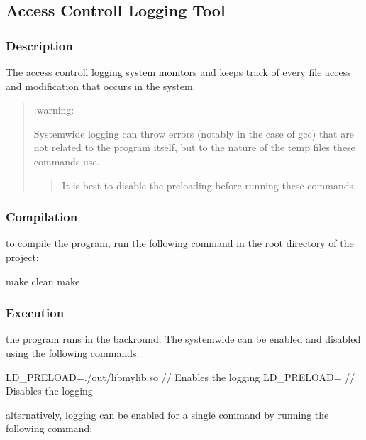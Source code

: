 \subsection*{Access Controll Logging Tool}

\subsubsection*{Description}

The access controll logging system monitors and keeps track of every file access and modification that occurs in the system.

\begin{quote}
\+:warning\+:

Systemwide logging can throw errors (notably in the case of \textquotesingle{}gcc\textquotesingle{}) that are not related to the program itself, but to the nature of the temp files these commands use.

\begin{quote}


It is best to disable the preloading before running these commands. \end{quote}
\end{quote}


\subsubsection*{Compilation}

to compile the program, run the following command in the root directory of the project\+:


\begin{DoxyCode}
make clean
make
\end{DoxyCode}


\subsubsection*{Execution}

the program runs in the backround. The systemwide can be enabled and disabled using the following commands\+:


\begin{DoxyCode}
LD\_PRELOAD=./out/libmylib.so    // Enables the logging
LD\_PRELOAD=                     // Disables the logging
\end{DoxyCode}


alternatively, logging can be enabled for a single command by running the following command\+:


